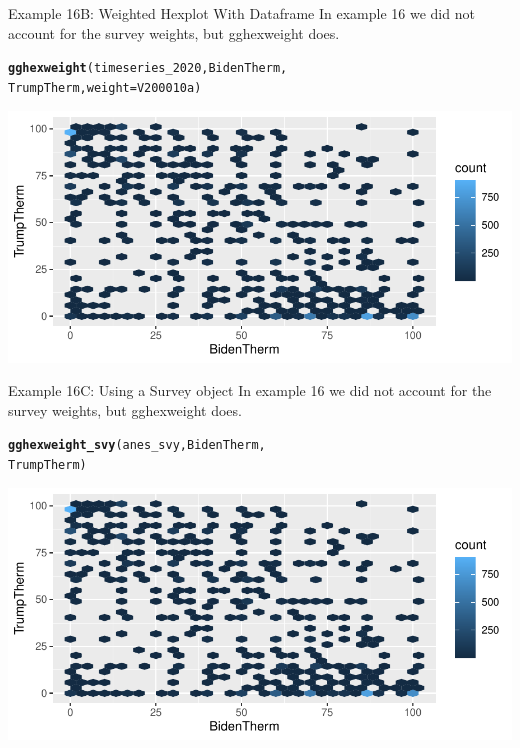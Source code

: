 \documentclass{beamer}\usepackage[]{graphicx}\usepackage[]{xcolor}
\makeatletter
\newcommand{\hlstd}[1]{\textcolor[rgb]{0.345,0.345,0.345}{#1}}%
\newcommand{\hlkwc}[1]{\textcolor[rgb]{0.333,0.667,0.333}{#1}}%
\newcommand{\hlkwd}[1]{\textcolor[rgb]{0.737,0.353,0.396}{\textbf{#1}}}%
\newenvironment{kframe}{%
 \def\at@end@of@kframe{}%
 \ifinner\ifhmode%
  \def\at@end@of@kframe{\end{minipage}}%
  \begin{minipage}{\columnwidth}%
 \fi\fi%
 \def\FrameCommand##1{\hskip\@totalleftmargin \hskip-\fboxsep
 \colorbox{shadecolor}{##1}\hskip-\fboxsep
     \hskip-\linewidth \hskip-\@totalleftmargin \hskip\columnwidth}%
 \MakeFramed {\advance\hsize-\width
   \@totalleftmargin\z@ \linewidth\hsize
   \@setminipage}}%
 {\par\unskip\endMakeFramed%
 \at@end@of@kframe}
\newenvironment{knitrout}{}{} %
\makeatother
\begin{document}
\begin{frame}[fragile]{Example 16B: Weighted Hexplot With Dataframe}
In example 16 we did not account for the survey weights, but gghexweight does.
\begin{knitrout}
\color{fgcolor}\begin{kframe}
\begin{alltt}
\hlkwd{gghexweight}\hlstd{(timeseries_2020, BidenTherm,}
    \hlstd{TrumpTherm,} \hlkwc{weight} \hlstd{= V200010a)}
\end{alltt}
\end{kframe}
\includegraphics[width=0.95\linewidth]{figure/unnamed-chunk-82-1} 
\end{knitrout}

\end{frame}



\begin{frame}[fragile]{Example 16C: Using a Survey object}
In example 16 we did not account for the survey weights, but gghexweight does.
\begin{knitrout}
\color{fgcolor}\begin{kframe}
\begin{alltt}
\hlkwd{gghexweight_svy}\hlstd{(anes_svy, BidenTherm,}
    \hlstd{TrumpTherm)}
\end{alltt}
\end{kframe}
\includegraphics[width=0.95\linewidth]{figure/unnamed-chunk-83-1} 
\end{knitrout}

\end{frame}
\end{document}
